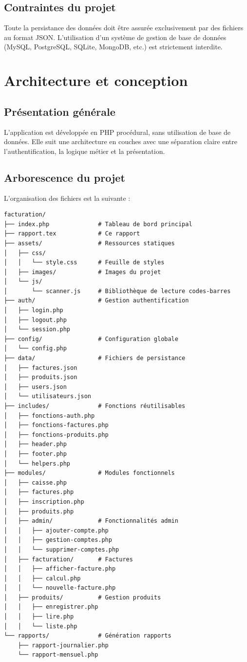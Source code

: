 \documentclass[12pt,a4paper,french]{report}
\begin{document}
\section{Contraintes du projet}

Toute la persistance des données doit être assurée exclusivement par des fichiers au format JSON.
 L'utilisation d'un système de gestion de base de données (MySQL, PostgreSQL, SQLite, MongoDB, etc.) 
 est strictement interdite.

\chapter{Architecture et conception}

\section{Présentation générale}

L'application est développée en PHP procédural, sans utilisation de base de données. 
Elle suit une architecture en couches avec une séparation claire entre l'authentification, la logique métier et 
la présentation.

\section{Arborescence du projet}

L'organisation des fichiers est la suivante :

\begin{verbatim}
facturation/
├── index.php              # Tableau de bord principal
├── rapport.tex            # Ce rapport
├── assets/                # Ressources statiques
│   ├── css/
│   │   └── style.css      # Feuille de styles
│   ├── images/            # Images du projet
│   └── js/
│       └── scanner.js     # Bibliothèque de lecture codes-barres
├── auth/                  # Gestion authentification
│   ├── login.php
│   ├── logout.php
│   └── session.php
├── config/                # Configuration globale
│   └── config.php
├── data/                  # Fichiers de persistance
│   ├── factures.json
│   ├── produits.json
│   ├── users.json
│   └── utilisateurs.json
├── includes/              # Fonctions réutilisables
│   ├── fonctions-auth.php
│   ├── fonctions-factures.php
│   ├── fonctions-produits.php
│   ├── header.php
│   ├── footer.php
│   └── helpers.php
├── modules/               # Modules fonctionnels
│   ├── caisse.php
│   ├── factures.php
│   ├── inscription.php
│   ├── produits.php
│   ├── admin/             # Fonctionnalités admin
│   │   ├── ajouter-compte.php
│   │   ├── gestion-comptes.php
│   │   └── supprimer-comptes.php
│   ├── facturation/       # Factures
│   │   ├── afficher-facture.php
│   │   ├── calcul.php
│   │   └── nouvelle-facture.php
│   ├── produits/          # Gestion produits
│   │   ├── enregistrer.php
│   │   ├── lire.php
│   │   └── liste.php
└── rapports/              # Génération rapports
    ├── rapport-journalier.php
    └── rapport-mensuel.php
\end{verbatim}
\end{document}
